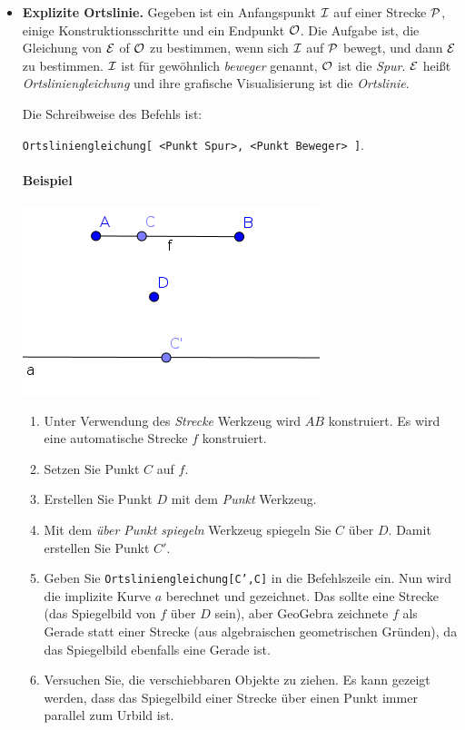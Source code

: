 \documentclass{article}
\begin{document}
\begin{itemize}
\item\textbf{Explizite Ortslinie.}
Gegeben ist ein Anfangspunkt $\cal{I}$ auf einer Strecke $\cal{P}$, einige Konstruktionsschritte und ein Endpunkt $\cal O$. Die Aufgabe ist, die Gleichung von $\cal E$ of $\cal O$ zu bestimmen, wenn sich  $\cal I$ auf $\cal P$ bewegt, und dann  $\cal E$ zu bestimmen. $\cal I$ ist für gewöhnlich \textit{beweger} genannt, $\cal O$ ist die \textit{Spur}. $\cal E$ heißt \textit{Ortsliniengleichung} und ihre grafische Visualisierung ist die \textit{Ortslinie}.

Die Schreibweise des Befehls ist:
\begin{center}
    \texttt{Ortsliniengleichung[ <Punkt Spur>, <Punkt Beweger> ]}.
\end{center}

\paragraph{Beispiel}
\begin{center}
\includegraphics[scale=0.5]{LocusEquation-example-explicit}
\end{center}
\begin{enumerate}
    \item Unter Verwendung des \textit{Strecke} Werkzeug wird $AB$ konstruiert. Es wird eine automatische Strecke $f$ konstruiert.
    \item Setzen Sie Punkt $C$ auf $f$.
    \item Erstellen Sie Punkt $D$ mit dem \textit{Punkt} Werkzeug.
    \item Mit dem \textit{über Punkt spiegeln} Werkzeug spiegeln Sie $C$ über $D$. Damit erstellen Sie Punkt $C'$.
    \item Geben Sie \texttt{Ortsliniengleichung[C',C]} in die Befehlszeile ein. Nun wird die implizite Kurve $a$ berechnet und gezeichnet. Das sollte eine Strecke (das Spiegelbild von $f$ über $D$ sein), aber GeoGebra zeichnete $f$ als Gerade statt einer Strecke (aus algebraischen geometrischen Gründen), da das Spiegelbild ebenfalls eine Gerade ist.
    \item Versuchen Sie, die verschiebbaren Objekte zu ziehen. Es kann gezeigt werden, dass das Spiegelbild einer Strecke über einen Punkt immer parallel zum Urbild ist.
\end{enumerate}


\end{itemize}
\end{document}
